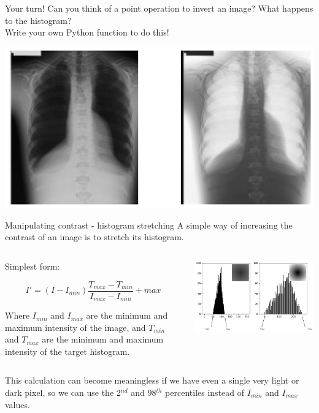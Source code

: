 \documentclass[9pt, aspectratio=169]{beamer}
\begin{document}
\begin{frame}
    {Your turn!}
    Can you think of a point operation to invert an image? What happens to the histogram?\\Write your own Python function to do this!

    \centering
    \includegraphics[width=.8\textwidth]{invert_image.png}

\end{frame}
\begin{frame}{Manipulating contrast - histogram stretching}
    A simple way of increasing the contrast of an image is to stretch its histogram.

    \begin{columns}
        \begin{column}{.4\textwidth}
            Simplest form:

            $$I' = (I - I_{min}) \frac{T_{max}-T_{min}}{I_{max}-I_{min}} + max$$

            Where $I_{min}$ and $I_{max}$ are the minimum and maximum intensity of the image, and $T_{min}$ and $T_{max}$ are the minimum and maximum intensity of the target histogram.
        \end{column}
        \begin{column}{.6\textwidth}
            \centering
            \includegraphics[width=\textwidth]{histo_stretching_example.png}
        \end{column}
    \end{columns}
    \pause
    This calculation can become meaningless if we have even a single very light or dark pixel, so we can use the 2$^{nd}$ and 98$^{th}$ percentiles instead of $I_{min}$ and $I_{max}$ values.
\end{frame}
\end{document}
